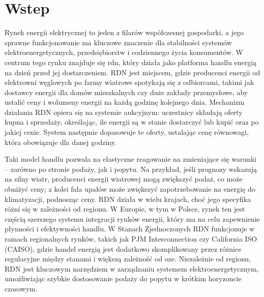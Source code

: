 \chapter{Wstep}
\label{ch:wstep}

Rynek energii elektrycznej to jeden z filarów współczesnej gospodarki, a jego sprawne funkcjonowanie ma kluczowe znaczenie dla stabilności systemów elektroenergetycznych, przedsiębiorstw i codziennego życia konsumentów. W centrum tego rynku znajduje się \gls{rdn}, który działa jako platforma handlu energią na dzień przed jej dostarczeniem. RDN jest miejscem, gdzie producenci energii od elektrowni węglowych po farmy wiatrowe spotykają się z odbiorcami, takimi jak dostawcy energii dla domów mieszkalnych czy duże zakłady przemysłowe, aby ustalić ceny i wolumeny energii na każdą godzinę kolejnego dnia. Mechanizm działania RDN opiera się na systemie aukcyjnym: uczestnicy składają oferty kupna i sprzedaży, określając, ile energii są w stanie dostarczyć lub kupić oraz po jakiej cenie. System następnie dopasowuje te oferty, ustalając cenę równowagi, która obowiązuje dla danej godziny.

Taki model handlu pozwala na elastyczne reagowanie na zmieniające się warunki – zarówno po stronie podaży, jak i popytu. Na przykład, jeśli prognozy wskazują na silny wiatr, producenci energii wiatrowej mogą zwiększyć podaż, co może obniżyć ceny; z kolei fala upałów może zwiększyć zapotrzebowanie na energię do klimatyzacji, podnosząc ceny. RDN działa w wielu krajach, choć jego specyfika różni się w zależności od regionu. W Europie, w tym w Polsce, rynek ten jest częścią szerszego systemu integracji rynków energii, który ma na celu zapewnienie płynności i efektywności handlu. W Stanach Zjednoczonych RDN funkcjonuje w ramach regionalnych rynków, takich jak PJM Interconnection czy California ISO (CAISO), gdzie handel energią jest dodatkowo skomplikowany przez różnice regulacyjne między stanami i większą zależność od \gls{oze}. Niezależnie od regionu, RDN jest kluczowym narzędziem w zarządzaniu systemem elektroenergetycznym, umożliwiając szybkie dostosowanie podaży do popytu w krótkim horyzoncie czasowym.

